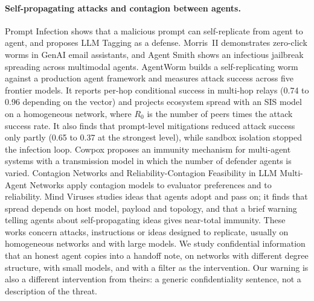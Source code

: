 \documentclass[preprint,12pt,authoryear]{elsarticle}
\newcommand{\Rzero}{R_0}
\begin{document}
\paragraph{Self-propagating attacks and contagion between agents.}
Prompt Infection \citep{lee2024} shows that a malicious prompt can self-replicate from agent to agent, and proposes LLM Tagging as a defense. Morris~II \citep{cohen2024} demonstrates zero-click worms in GenAI email assistants, and Agent Smith \citep{gu2024} shows an infectious jailbreak spreading across multimodal agents. AgentWorm \citep{zhang2026} builds a self-replicating worm against a production agent framework and measures attack success across five frontier models. It reports per-hop conditional success in multi-hop relays (0.74 to 0.96 depending on the vector) and projects ecosystem spread with an SIS model on a homogeneous network, where $\Rzero$ is the number of peers times the attack success rate. It also finds that prompt-level mitigations reduced attack success only partly (0.65 to 0.37 at the strongest level), while sandbox isolation stopped the infection loop. Cowpox \citep{cowpox2025} proposes an immunity mechanism for multi-agent systems with a transmission model in which the number of defender agents is varied. Contagion Networks \citep{anon2026d} and Reliability-Contagion Feasibility in LLM Multi-Agent Networks \citep{anon2026e} apply contagion models to evaluator preferences and to reliability. Mind Viruses \citep{papadopoulos2026} studies ideas that agents adopt and pass on; it finds that spread depends on host model, payload and topology, and that a brief warning telling agents about self-propagating ideas gives near-total immunity. These works concern attacks, instructions or ideas designed to replicate, usually on homogeneous networks and with large models. We study confidential information that an honest agent copies into a handoff note, on networks with different degree structure, with small models, and with a filter as the intervention. Our warning is also a different intervention from theirs: a generic confidentiality sentence, not a description of the threat.
\end{document}
